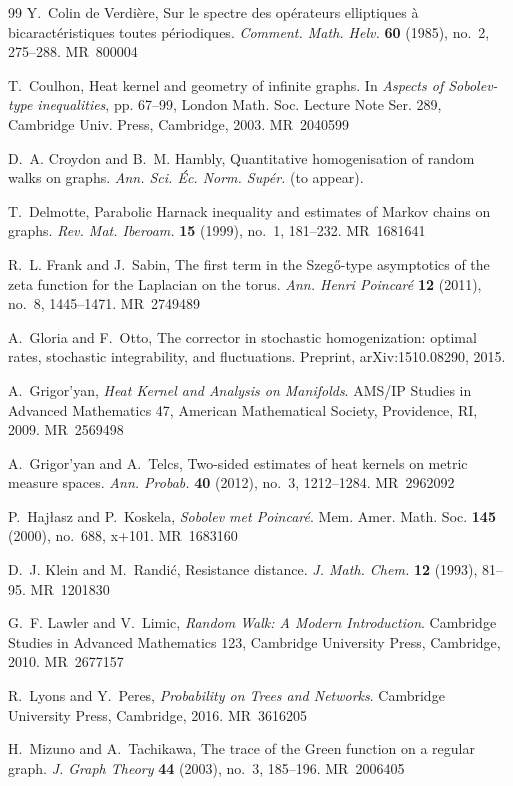 \documentclass[reqno]{amsart}
\providecommand{\MR}[1]{\textsc{MR}~#1}
\numberwithin{equation}{section}
\theoremstyle{definition}
\theoremstyle{remark}
\begin{document}
\begin{thebibliography}{99}
Y.~Colin de Verdière, Sur le spectre des opérateurs elliptiques à bicaractéristiques toutes périodiques.
\emph{Comment. Math. Helv.} \textbf{60} (1985), no.~2, 275--288.
\MR{800004}

T.~Coulhon, Heat kernel and geometry of infinite graphs.
In \emph{Aspects of Sobolev-type inequalities},
pp. 67--99, London Math. Soc. Lecture Note Ser. 289,
Cambridge Univ. Press, Cambridge, 2003.
\MR{2040599}


D.~A. Croydon and B.~M. Hambly, Quantitative homogenisation of random walks on graphs.
\emph{Ann. Sci. Éc. Norm. Supér.} (to appear).

T.~Delmotte, Parabolic Harnack inequality and estimates of Markov chains on graphs.
\emph{Rev. Mat. Iberoam.} \textbf{15} (1999), no.~1, 181--232.
\MR{1681641}

R.~L. Frank and J.~Sabin, The first term in the Szeg\H{o}-type asymptotics of the zeta function for the Laplacian on the torus.
\emph{Ann. Henri Poincar\'e} \textbf{12} (2011), no.~8, 1445--1471.
\MR{2749489}

A.~Gloria and F.~Otto, The corrector in stochastic homogenization: optimal rates, stochastic integrability, and fluctuations.
Preprint, arXiv:1510.08290, 2015.

A.~Grigor'yan, \emph{Heat Kernel and Analysis on Manifolds}.
AMS/IP Studies in Advanced Mathematics 47, American Mathematical Society, Providence, RI, 2009.
\MR{2569498}

A.~Grigor'yan and A.~Telcs, Two-sided estimates of heat kernels on metric measure spaces.
\emph{Ann. Probab.} \textbf{40} (2012), no.~3, 1212--1284.
\MR{2962092}

P.~Hajłasz and P.~Koskela, \emph{Sobolev met Poincaré}.
Mem. Amer. Math. Soc. \textbf{145} (2000), no.~688, x+101.
\MR{1683160}

D.~J. Klein and M.~Randi{\'c}, Resistance distance.
\emph{J. Math. Chem.} \textbf{12} (1993), 81--95.
\MR{1201830}

G.~F. Lawler and V.~Limic, \emph{Random Walk: A Modern Introduction}.
Cambridge Studies in Advanced Mathematics 123, Cambridge University Press, Cambridge, 2010.
\MR{2677157}

R.~Lyons and Y.~Peres, \emph{Probability on Trees and Networks}.
Cambridge University Press, Cambridge, 2016.
\MR{3616205}

H.~Mizuno and A.~Tachikawa, The trace of the Green function on a regular graph.
\emph{J. Graph Theory} \textbf{44} (2003), no.~3, 185--196.
\MR{2006405}

\end{thebibliography}
\end{document}
